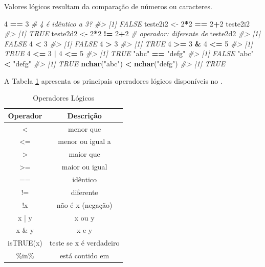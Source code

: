 \documentclass[]{book}
\newenvironment{Shaded}{\begin{snugshade}}{\end{snugshade}}
\newcommand{\KeywordTok}[1]{\textcolor[rgb]{0.13,0.29,0.53}{\textbf{#1}}}
\newcommand{\DecValTok}[1]{\textcolor[rgb]{0.00,0.00,0.81}{#1}}
\newcommand{\StringTok}[1]{\textcolor[rgb]{0.31,0.60,0.02}{#1}}
\newcommand{\CommentTok}[1]{\textcolor[rgb]{0.56,0.35,0.01}{\textit{#1}}}
\newcommand{\OperatorTok}[1]{\textcolor[rgb]{0.81,0.36,0.00}{\textbf{#1}}}
\newcommand{\NormalTok}[1]{#1}
\begin{document}
Valores lógicos resultam da comparação de números ou caracteres.

\begin{Shaded}
\begin{Highlighting}[]
\DecValTok{4} \OperatorTok{==}\StringTok{ }\DecValTok{3} \CommentTok{# 4 é idêntico a 3?}
\CommentTok{#> [1] FALSE}
\NormalTok{teste2i2 <-}\StringTok{ }\DecValTok{2}\OperatorTok{*}\DecValTok{2} \OperatorTok{==}\StringTok{ }\DecValTok{2}\OperatorTok{+}\DecValTok{2}
\NormalTok{teste2i2}
\CommentTok{#> [1] TRUE}
\NormalTok{teste2d2 <-}\StringTok{ }\DecValTok{2}\OperatorTok{*}\DecValTok{2} \OperatorTok{!=}\StringTok{ }\DecValTok{2}\OperatorTok{+}\DecValTok{2} \CommentTok{# operador: diferente de}
\NormalTok{teste2d2}
\CommentTok{#> [1] FALSE}
\DecValTok{4} \OperatorTok{<}\StringTok{ }\DecValTok{3}
\CommentTok{#> [1] FALSE}
\DecValTok{4} \OperatorTok{>}\StringTok{ }\DecValTok{3}
\CommentTok{#> [1] TRUE}
\DecValTok{4} \OperatorTok{>=}\StringTok{ }\DecValTok{3} \OperatorTok{&}\StringTok{ }\DecValTok{4} \OperatorTok{<=}\StringTok{ }\DecValTok{5}
\CommentTok{#> [1] TRUE}
\DecValTok{4} \OperatorTok{<=}\StringTok{ }\DecValTok{3} \OperatorTok{|}\StringTok{ }\DecValTok{4} \OperatorTok{<=}\StringTok{ }\DecValTok{5}
\CommentTok{#> [1] TRUE}
\StringTok{"abc"} \OperatorTok{==}\StringTok{ "defg"}
\CommentTok{#> [1] FALSE}
\StringTok{"abc"} \OperatorTok{<}\StringTok{ "defg"}
\CommentTok{#> [1] TRUE}
\KeywordTok{nchar}\NormalTok{(}\StringTok{"abc"}\NormalTok{) }\OperatorTok{<}\StringTok{ }\KeywordTok{nchar}\NormalTok{(}\StringTok{"defg"}\NormalTok{)}
\CommentTok{#> [1] TRUE}
\end{Highlighting}
\end{Shaded}

A Tabela \ref{tab:oper-logic} apresenta os principais operadores lógicos
disponíveis no .

\begin{table}

\caption{\label{tab:oper-logic}Operadores Lógicos}
\centering
\begin{tabular}[t]{c|c}
\hline
Operador & Descrição\\
\hline
< & menor que\\
\hline
<= & menor ou igual a\\
\hline
> & maior que\\
\hline
>= & maior ou igual\\
\hline
== & idêntico\\
\hline
!= & diferente\\
\hline
!x & não é x (negação)\\
\hline
x | y & x ou y\\
\hline
x \& y & x e y\\
\hline
isTRUE(x) & teste se x é verdadeiro\\
\hline
\%in\% & está contido em\\
\hline
\end{tabular}
\end{table}
\end{document}
